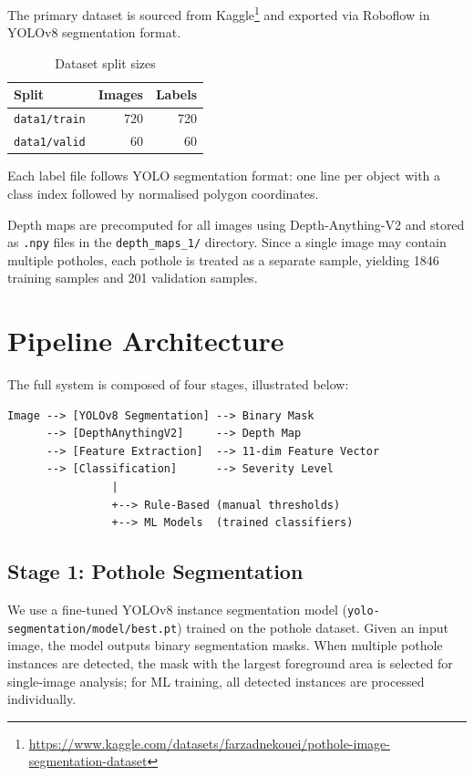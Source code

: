 \documentclass[12pt, a4paper]{article}
\begin{document}
The primary dataset is sourced from Kaggle\footnote{\url{https://www.kaggle.com/datasets/farzadnekouei/pothole-image-segmentation-dataset}} and exported via Roboflow in YOLOv8 segmentation format.

\begin{table}[H]
\centering
\caption{Dataset split sizes}
\begin{tabular}{lrr}
\toprule
\textbf{Split} & \textbf{Images} & \textbf{Labels} \\
\midrule
\texttt{data1/train} & 720 & 720 \\
\texttt{data1/valid} & 60 & 60 \\
\bottomrule
\end{tabular}
\end{table}

Each label file follows YOLO segmentation format: one line per object with a class index followed by normalised polygon coordinates.

Depth maps are precomputed for all images using Depth-Anything-V2 and stored as \texttt{.npy} files in the \texttt{depth\_maps\_1/} directory. Since a single image may contain multiple potholes, each pothole is treated as a separate sample, yielding 1846 training samples and 201 validation samples.

\section{Pipeline Architecture}
\label{sec:pipeline}

The full system is composed of four stages, illustrated below:

\begin{verbatim}
Image --> [YOLOv8 Segmentation] --> Binary Mask
      --> [DepthAnythingV2]     --> Depth Map
      --> [Feature Extraction]  --> 11-dim Feature Vector
      --> [Classification]      --> Severity Level
                |
                +--> Rule-Based (manual thresholds)
                +--> ML Models  (trained classifiers)
\end{verbatim}

\subsection{Stage 1: Pothole Segmentation}
\label{subsec:segmentation}

We use a fine-tuned YOLOv8 instance segmentation model (\texttt{yolo-segmentation/model/best.pt}) trained on the pothole dataset. Given an input image, the model outputs binary segmentation masks. When multiple pothole instances are detected, the mask with the largest foreground area is selected for single-image analysis; for ML training, all detected instances are processed individually.
\end{document}
